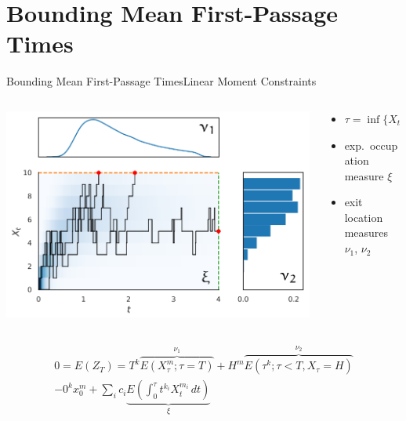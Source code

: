 \documentclass[10pt]{beamer}
\newcommand{\expSym}{{E}}
\newcommand{\E}[1]{\ensuremath{\expSym\left(#1\right)}}
\newcommand{\bottomcite}[1]{\vspace*{\fill} {\scriptsize \parencite{#1}}}
\begin{document}
\section{Bounding Mean First-Passage Times}
\begin{frame}{Bounding Mean First-Passage Times}{Linear Moment Constraints}
    \begin{columns}
        \begin{column}{.4\paperwidth}
            \vspace{1cm}
            \includegraphics[scale=.4]{../gfx/decomp1.pdf}
        \end{column}
        \begin{column}{.45\paperwidth}
            \begin{itemize}
                \item $\tau=\inf\{X_t \geq H \mid t\geq 0\}\land T$
                \item exp.\ occupation measure $\xi$
                \item exit location measures $\nu_1$, $\nu_2$
            \end{itemize}
        \end{column}
    \end{columns}

\begin{multline*}\label{eq:model_constraints}
    0 = \E{Z_T} = T^k\overbrace{\E{X_{\tau}^m;\tau=T}}^{\nu_1} + H^m\overbrace{\E{{\tau}^k;\tau < T, X_{\tau}=H}}^{\nu_2}\\
 	- 0^kx_0^{m}
    + \sum_{i}c_i\underbrace{\E{\int_{0}^{\tau} t^{k_i}X_t^{m_i}\,dt}}_{\xi}
\end{multline*}
\bottomcite{backenkohler2019bounding}
\end{frame}
\end{document}
